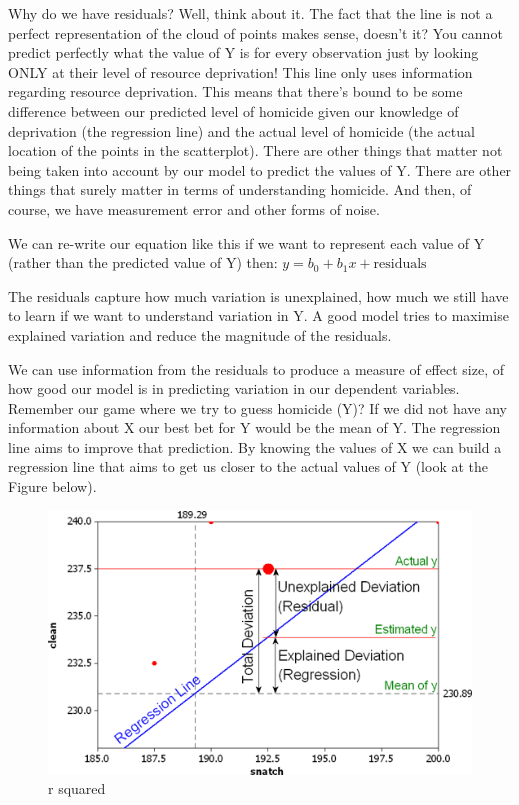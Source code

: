 \documentclass[
]{book}
\begin{document}
Why do we have residuals? Well, think about it. The fact that the line is not a perfect representation of the cloud of points makes sense, doesn't it? You cannot predict perfectly what the value of Y is for every observation just by looking ONLY at their level of resource deprivation! This line only uses information regarding resource deprivation. This means that there's bound to be some difference between our predicted level of homicide given our knowledge of deprivation (the regression line) and the actual level of homicide (the actual location of the points in the scatterplot). There are other things that matter not being taken into account by our model to predict the values of Y. There are other things that surely matter in terms of understanding homicide. And then, of course, we have measurement error and other forms of noise.

We can re-write our equation like this if we want to represent each value of Y (rather than the predicted value of Y) then:
\(y = b_0 + b_1x + \text{residuals}\)

The residuals capture how much variation is unexplained, how much we still have to learn if we want to understand variation in Y. A good model tries to maximise explained variation and reduce the magnitude of the residuals.

We can use information from the residuals to produce a measure of effect size, of how good our model is in predicting variation in our dependent variables. Remember our game where we try to guess homicide (Y)? If we did not have any information about X our best bet for Y would be the mean of Y. The regression line aims to improve that prediction. By knowing the values of X we can build a regression line that aims to get us closer to the actual values of Y (look at the Figure below).

\begin{figure}
\centering
\includegraphics{Images/weight2.png}
\caption{r squared}
\end{figure}
\end{document}

